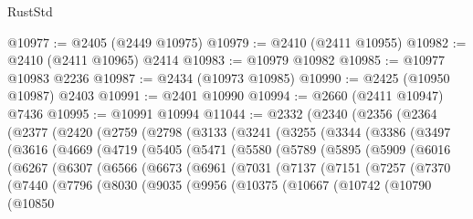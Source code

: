 \begin{lexlean}{RustStd}
\begin{coremodule}
@10977 := @2405 (@2449 @10975)
@10979 := @2410 (@2411 @10955)
@10982 := @2410 (@2411 @10965) @2414
@10983 := @10979 @10982
@10985 := @10977 @10983 @2236
@10987 := @2434 (@10973 @10985)
@10990 := @2425 (@10950 @10987) @2403
@10991 := @2401 @10990
@10994 := @2660 (@2411 @10947) @7436
@10995 := @10991 @10994
@11044 := @2332
    (@2340
      (@2356
        (@2364
          (@2377
            (@2420
              (@2759
                (@2798
                  (@3133
                    (@3241
                      (@3255
                        (@3344
                          (@3386
                            (@3497
                              (@3616
                                (@4669
                                  (@4719
                                    (@5405
                                      (@5471
                                        (@5580
                                          (@5789
                                            (@5895
                                              (@5909
                                                (@6016
                                                  (@6267
                                                    (@6307
                                                      (@6566
                                                        (@6673
                                                          (@6961
                                                            (@7031
                                                              (@7137
                                                                (@7151
                                                                  (@7257
                                                                    (@7370
                                                                      (@7440
                                                                        (@7796
                                                                          (@8030
                                                                            (@9035
                                                                              (@9956
                                                                                (@10375
                                                                                  (@10667
                                                                                    (@10742
                                                                                      (@10790
                                                                                        (@10850

\end{coremodule}
\end{lexlean}
